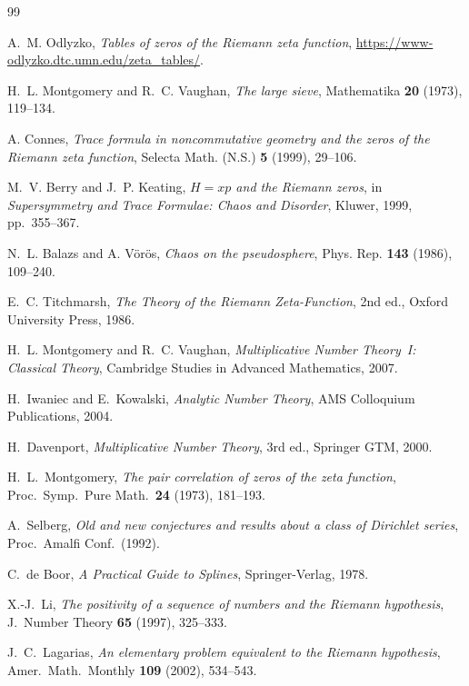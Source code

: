 \documentclass[12pt]{amsart}
\numberwithin{equation}{section}
\theoremstyle{definition}
\begin{document}
\begin{thebibliography}{99}

 A.~M. Odlyzko,
\textit{Tables of zeros of the Riemann zeta function},
\url{https://www-odlyzko.dtc.umn.edu/zeta_tables/}.

 H.~L. Montgomery and R.~C. Vaughan,
\textit{The large sieve},
Mathematika \textbf{20} (1973), 119--134.

 A. Connes,
\textit{Trace formula in noncommutative geometry and the zeros of the Riemann zeta function},
Selecta Math. (N.S.) \textbf{5} (1999), 29--106.

 M.~V. Berry and J.~P. Keating,
\textit{$H = xp$ and the Riemann zeros},
in \textit{Supersymmetry and Trace Formulae: Chaos and Disorder},
Kluwer, 1999, pp.\ 355--367.

 N.~L. Balazs and A. V\"or\"os,
\textit{Chaos on the pseudosphere},
Phys. Rep. \textbf{143} (1986), 109--240.

 E.~C. Titchmarsh,
\textit{The Theory of the Riemann Zeta-Function},
2nd ed., Oxford University Press, 1986.

 H.~L. Montgomery and R.~C. Vaughan,
\textit{Multiplicative Number Theory~I: Classical Theory},
Cambridge Studies in Advanced Mathematics, 2007.

 H.~Iwaniec and E.~Kowalski,
\textit{Analytic Number Theory},
AMS Colloquium Publications, 2004.

 H.~Davenport,
\textit{Multiplicative Number Theory},
3rd ed., Springer GTM, 2000.

 H.~L.~Montgomery,
\textit{The pair correlation of zeros of the zeta function},
Proc.\ Symp.\ Pure Math.\ \textbf{24} (1973), 181--193.

 A.~Selberg,
\textit{Old and new conjectures and results about a class of Dirichlet series},
Proc.\ Amalfi Conf.\ (1992).

 C.~de Boor,
\textit{A Practical Guide to Splines},
Springer-Verlag, 1978.

 X.-J.~Li,
\textit{The positivity of a sequence of numbers and the Riemann hypothesis},
J.\ Number Theory \textbf{65} (1997), 325--333.

 J.~C.~Lagarias,
\textit{An elementary problem equivalent to the Riemann hypothesis},
Amer.\ Math.\ Monthly \textbf{109} (2002), 534--543.


\end{thebibliography}
\end{document}
